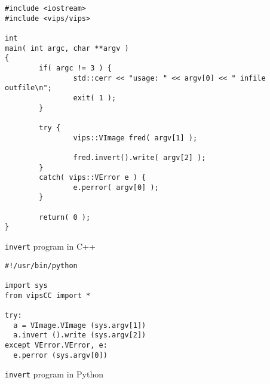 \begin{fig2}
\begin{verbatim}
#include <iostream>
#include <vips/vips>

int
main( int argc, char **argv )
{
        if( argc != 3 ) {
                std::cerr << "usage: " << argv[0] << " infile outfile\n";
                exit( 1 );
        }

        try {
                vips::VImage fred( argv[1] );

                fred.invert().write( argv[2] );
        }
        catch( vips::VError e ) {
                e.perror( argv[0] );
        }

        return( 0 );
}
\end{verbatim}
\caption{\texttt{invert} program in C++}
\label{fg:invert-c++}
\end{fig2}

\begin{fig2}
\begin{verbatim}
#!/usr/bin/python

import sys
from vipsCC import *

try:
  a = VImage.VImage (sys.argv[1])
  a.invert ().write (sys.argv[2])
except VError.VError, e:
  e.perror (sys.argv[0])
\end{verbatim}
\caption{\texttt{invert} program in Python}
\label{fg:invert-py}
\end{fig2}
